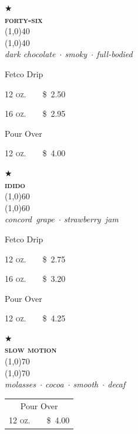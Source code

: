\documentclass[letterpaper, 12pt]{article}%
\newcommand{\menuitem}[4]{
 \centering
  $\bigstar$\\
  \smallskip\vspace{0.1em}
  \textbf{\sffamily \textsc{\large#2}}\vspace{-1ex}\\
  \line(1,0){#1}\vspace{-2ex}\\
  \line(1,0){#1}\vspace{0.5ex}\\
  \smallskip
  \emph{\footnotesize#3}\\
  \vspace*{\fill}
  {\small#4}
}
\newcommand{\flowtherefore}{~~\raisebox{0.2ex}{$\therefore$}~~}
\newcommand{\price}[2]{
 \textsc{\small#1}\flowtherefore\$~\textsc{\small#2}
}
\begin{document}
{\centering
 \begin{minipage}[t][0.26\textwidth][b]{0.3\textwidth}
  \centering
  \menuitem{40}{
   forty-six}{
   dark chocolate~$\cdot$ smoky~$\cdot$ full-bodied}{
   Fetco Drip
   
   \price{12 oz.}{2.50}
   
   \price{16 oz.}{2.95}   
   
   Pour Over
   
   \price{12 oz.}{4.00}
  }
 \end{minipage} 
 \begin{minipage}[t][0.26\textwidth][b]{0.3\textwidth}
  \centering
  \menuitem{60}{
   idido}{
   concord~grape~$\cdot$ strawberry~jam}{
   Fetco Drip
   
   \price{12 oz.}{2.75}
   
   \price{16 oz.}{3.20}
   
   Pour Over
   
   \price{12 oz.}{4.25}
  } 
 \end{minipage} 
 \begin{minipage}[t][0.22\textwidth][b]{0.3\textwidth}
  \centering
  \menuitem{70}{
   slow motion}{
   molasses~$\cdot$ cocoa~$\cdot$ smooth~$\cdot$ decaf}{
   \begin{tabular}{@{} c @{}}
   Pour Over\\
   \price{12 oz.}{4.00}\\
   \end{tabular}
   
   \rule{0pt}{1.1em}
  }
 \end{minipage} 
 
}

\rule{0pt}{0pt}
\end{document}
